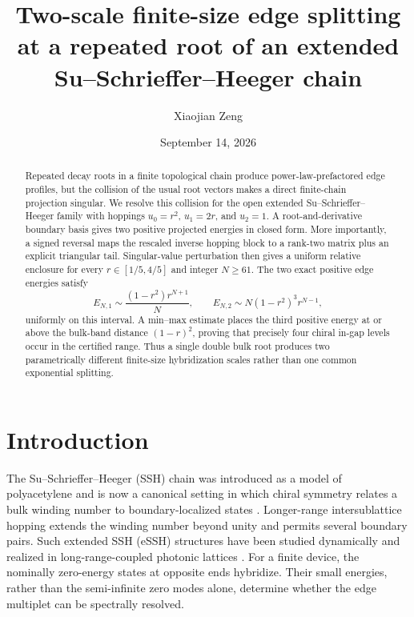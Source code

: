 \documentclass[aps,prb,reprint,superscriptaddress,longbibliography]{revtex4-2}
\begin{document}
\title{Two-scale finite-size edge splitting at a repeated root of an extended Su--Schrieffer--Heeger chain}

\author{Xiaojian Zeng}

\date{September 14, 2026}

\begin{abstract}
Repeated decay roots in a finite topological chain produce power-law-prefactored
edge profiles, but the collision of the usual root vectors makes a direct
finite-chain projection singular.  We resolve this collision for the open
extended Su--Schrieffer--Heeger family with hoppings
$u_0=r^2$, $u_1=2r$, and $u_2=1$.  A root-and-derivative boundary basis gives
two positive projected energies in closed form.  More importantly, a signed
reversal maps the rescaled inverse hopping block to a rank-two matrix plus an
explicit triangular tail.  Singular-value perturbation then gives a uniform
relative enclosure for every $r\in[1/5,4/5]$ and integer $N\geq61$.
The two exact positive edge energies satisfy
\begin{equation*}
 E_{N,1}\sim \frac{(1-r^2)r^{N+1}}{N},\qquad
 E_{N,2}\sim N(1-r^2)^3r^{N-1},
\end{equation*}
uniformly on this interval.  A min--max estimate places the third positive
energy at or above the bulk-band distance $(1-r)^2$, proving that precisely
four chiral in-gap levels occur in the certified range.  Thus a single
double bulk root produces two parametrically different finite-size
hybridization scales rather than one common exponential splitting.
\end{abstract}

\maketitle

\section{Introduction}

The Su--Schrieffer--Heeger (SSH) chain was introduced as a model of
polyacetylene \cite{Su1979} and is now a canonical setting in which chiral
symmetry relates a bulk winding number to boundary-localized states
\cite{Grizzi2026}.  Longer-range intersublattice hopping extends the winding
number beyond unity and permits several boundary pairs.  Such extended SSH
(eSSH) structures have been studied dynamically \cite{Ghosh2023} and realized
in long-range-coupled photonic lattices \cite{Li2024}.  For a finite device,
the nominally zero-energy states at opposite ends hybridize.  Their small
energies, rather than the semi-infinite zero modes alone, determine whether
the edge multiplet can be spectrally resolved.
\end{document}
